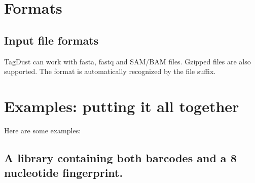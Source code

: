 \documentclass[11pt,a4paper,oneside]{book}
\begin{document}
\section{Formats}
\subsection{Input file formats}

TagDust can work with fasta, fastq and SAM/BAM files. Gzipped files are also supported. The format is automatically recognized by the file suffix. %
 




%
 

\section{Examples: putting it all together}

Here are some examples: 

\subsection{A library containing both barcodes and a 8 nucleotide fingerprint.}
\end{document}
